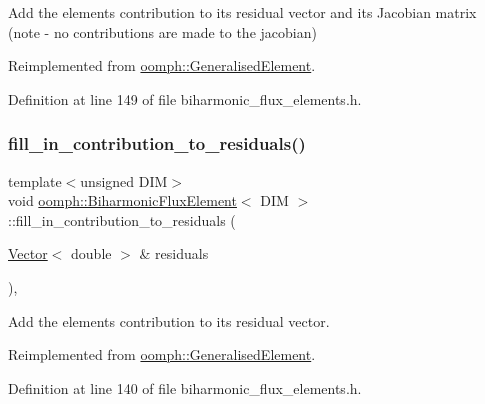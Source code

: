 Add the element\textquotesingle{}s contribution to its residual vector and its Jacobian matrix (note -\/ no contributions are made to the jacobian) 



Reimplemented from \hyperlink{classoomph_1_1GeneralisedElement_a6ae09fc0d68e4309ac1b03583d252845}{oomph\+::\+Generalised\+Element}.



Definition at line 149 of file biharmonic\+\_\+flux\+\_\+elements.\+h.

\mbox{\label{classoomph_1_1BiharmonicFluxElement_ac957e958c25b7ecede49aac5393240f2}} 
\subsubsection{\texorpdfstring{fill\+\_\+in\+\_\+contribution\+\_\+to\+\_\+residuals()}{fill\_in\_contribution\_to\_residuals()}}
{\footnotesize\ttfamily template$<$unsigned D\+IM$>$ \\
void \hyperlink{classoomph_1_1BiharmonicFluxElement}{oomph\+::\+Biharmonic\+Flux\+Element}$<$ D\+IM $>$\+::fill\+\_\+in\+\_\+contribution\+\_\+to\+\_\+residuals (\begin{DoxyParamCaption}\item[{\hyperlink{classoomph_1_1Vector}{Vector}$<$ double $>$ \&}]{residuals }\end{DoxyParamCaption})\hspace{0.3cm}{\ttfamily [inline]}, {\ttfamily [virtual]}}



Add the element\textquotesingle{}s contribution to its residual vector. 



Reimplemented from \hyperlink{classoomph_1_1GeneralisedElement_a310c97f515e8504a48179c0e72c550d7}{oomph\+::\+Generalised\+Element}.



Definition at line 140 of file biharmonic\+\_\+flux\+\_\+elements.\+h.

\mbox{\label{classoomph_1_1BiharmonicFluxElement_ab01c12b941f2fdf9c5b90fb768efd40a}} 
